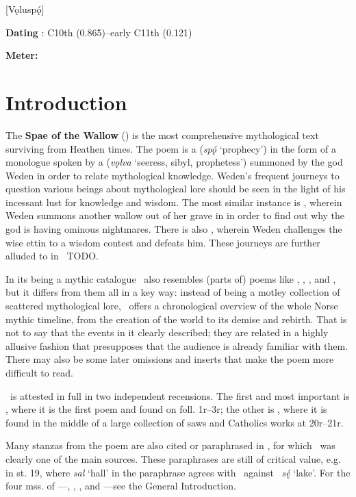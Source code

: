 [Vǫluspǫ́]

\begin{flushright}%
\textbf{Dating} \parencite{Sapp2022}: C10th (0.865)–early C11th (0.121)

\textbf{Meter:} \Fornyrdislag%
\end{flushright}

\section{Introduction}

The \textbf{Spae of the Wallow} (\Voluspa) is the most comprehensive mythological text surviving from Heathen times.  The poem is a  (\emph{spǫ́} ‘prophecy’) in the form of a monologue spoken by a  (\emph{vǫlva} ‘seeress, sibyl, prophetess’) summoned by the god Weden in order to relate mythological knowledge.  Weden’s frequent journeys to question various beings about mythological lore should be seen in the light of his incessant lust for knowledge and wisdom.  The most similar instance is \Baldrsdraumar, wherein Weden summons another wallow out of her grave in  in order to find out why the god  is having ominous nightmares.  There is also \Vafthrudnismal, wherein Weden challenges the wise ettin  to a wisdom contest and defeats him.  These journeys are further alluded to in \Harbardsljod\ TODO.

In its being a mythic catalogue \Voluspa\ also resembles (parts of) poems like \Havamal, \Grimnismal, \Sigrdrifumal, and \Allvismal, but it differs from them all in a key way: instead of being a motley collection of scattered mythological lore, \Voluspa\ offers a chronological overview of the whole Norse mythic timeline, from the creation of the world to its demise and rebirth.  That is not to say that the events in it clearly described; they are related in a highly allusive fashion that presupposes that the audience is already familiar with them.  There may also be some later omissions and inserts that make the poem more difficult to read.

\Voluspa\ is attested in full in two independent recensions.  The first and most important is \Regius, where it is the first poem and found on foll. 1r–3r; the other is \Hauksbok, where it is found in the middle of a large collection of saws and Catholics works at 20r–21r.

Many stanzas from the poem are also cited or paraphrased in \Gylfaginning, for which \Voluspa\ was clearly one of the main sources.  These paraphrases are still of critical value, e.g. in st. 19, where \emph{sal} ‘hall’ in the paraphrase agrees with \Hauksbok\ against \Regius\ \emph{sę́} ‘lake’.  For the four mss. of \Gylfaginning—\RegiusProse, \Trajectinus, \Wormianus, and \Upsaliensis—see the General Introduction.

